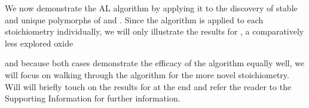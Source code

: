 %



%
We now demonstrate the AL algorithm by applying it to the discovery of stable and unique polymorphs of \IrOtwo and \IrOthree.
%
Since the algorithm is applied to each stoichiometry individually, we will only illustrate the results for \IrOthree, a comparatively less explored oxide

and because both cases demonstrate the efficacy of the algorithm equally well, we will focus on walking through the algorithm for the more novel \IrOthree stoichiometry.
%
Will will briefly touch on the results for \IrOtwo at the end and refer the reader to the Supporting Information for further information.


